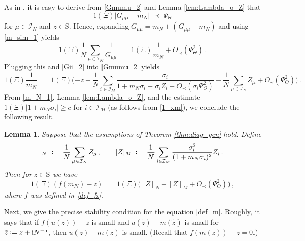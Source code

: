 \documentclass[11pt]{article} %
\numberwithin{equation}{section}
\numberwithin{figure}{section}
\theoremstyle{plain} %
\newtheorem{lemma}[theorem]{Lemma}
\theoremstyle{definition} %
\newcommand{\f}[1]{\boldsymbol{\mathrm{#1}}} %
\renewcommand{\cal}{\mathcal}
\newcommand{\ii}{\mathrm{i}}
\newcommand*{\deq}{\mathrel{\vcenter{\baselineskip0.65ex \lineskiplimit0pt \hbox{.}\hbox{.}}}=}
\renewcommand{\geq}{\geqslant}
\newcommand{\ind}[1]{\f 1 (#1)}
\newcommand{\pb}[1]{\bigl({#1}\bigr)}
\newcommand{\pBB}[1]{\Biggl({#1}\Biggr)}
\newcommand{\abs}[1]{\lvert #1 \rvert}
\begin{document}
As in \cite[Lemma 4.7]{BEKYY}, it is easy to derive from \eqref{Gmumu_2} and Lemma \ref{lem:Lambda_o_Z} that
\begin{equation} \label{Gmumu-m}
\ind{\Xi} \abs{G_{\mu \mu} - m_N} \;\prec\; \Psi_\Theta
\end{equation}
for $\mu \in \cal I_N$ and $z \in \f S$. Hence, expanding $G_{\mu \mu} = m_N + (G_{\mu \mu} - m_N)$ and using \eqref{m_sim_1} yields
\begin{equation*}
\ind{\Xi} \frac{1}{N} \sum_{\mu \in \cal I_N} \frac{1}{G_{\mu \mu}} \;=\; \ind{\Xi} \frac{1}{m_N} + O_\prec(\Psi_\Theta^2)\,.
\end{equation*}
Plugging this and \eqref{Gii_2} into \eqref{Gmumu_2} yields
\begin{equation} \label{m_N_1}
\ind{\Xi} \frac{1}{m_N} \;=\; \ind{\Xi}\pBB{-z + \frac{1}{N} \sum_{i \in \cal I_M} \frac{\sigma_i}{1 + m_N \sigma_i + \sigma_i Z_i + O_\prec(\sigma_i \Psi_\Theta^2)} - \frac{1}{N} \sum_{\mu \in \cal I_N} Z_\mu + O_\prec(\Psi_\Theta^2)}\,.
\end{equation}
From \eqref{m_N_1}, Lemma \ref{lem:Lambda_o_Z}, and the estimate $\ind{\Xi} \abs{1 + m_N \sigma_i} \geq c$ for $i \in \cal I_M$ (as follows from \eqref{1+xm}), we conclude the following result.

\begin{lemma} \label{lem:calD_est}
Suppose that the assumptions of Theorem \ref{thm:diag_gen} hold.
Define
\begin{equation*}
[Z]_N \;\deq\; \frac{1}{N} \sum_{\mu \in \cal I_N} Z_\mu\,, \qquad [Z]_M \;\deq\; \frac{1}{N} \sum_{i \in \cal I_M} \frac{\sigma_i^2}{(1 + m_N \sigma_i)^2} Z_i\,.
\end{equation*}
Then for $z \in \f S$ we have
\begin{equation} \label{calD_bound}
\ind{\Xi} (f(m_N) - z) \;=\; \ind{\Xi} \pb{[Z]_N  + [Z]_M + O_\prec(\Psi_\Theta^2)}\,,
\end{equation}
where $f$ was defined in \eqref{def_fx}.
\end{lemma}


Next, we give the precise stability condition for the equation \eqref{def_m}. Roughly, it says that if $f(u(z)) - z$ is small and $u(\tilde z) - m(\tilde z)$ is small for $\tilde z \deq z + \ii N^{-5}$, then $u(z) - m(z)$ is small. (Recall that $f(m(z)) - z = 0$.)
\end{document}
